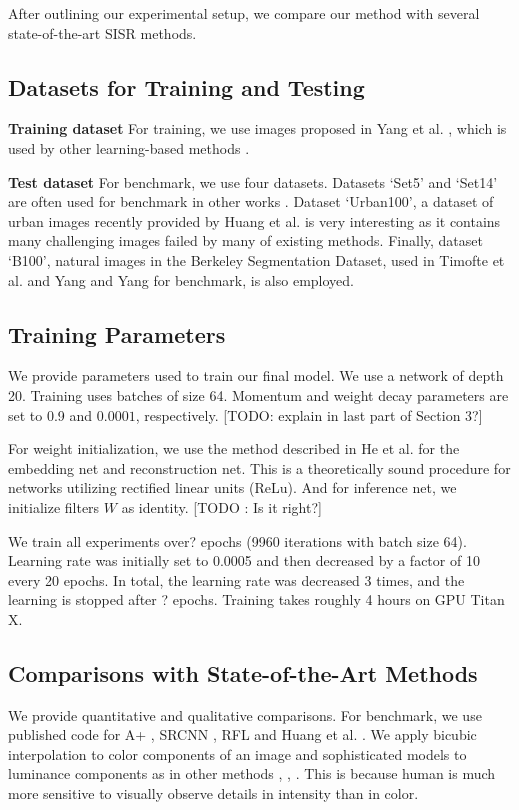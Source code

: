 \documentclass[10pt,twocolumn,letterpaper]{article}
\begin{document}
After outlining our experimental setup, we compare our method with several state-of-the-art SISR methods. 

\subsection{Datasets for Training and Testing}
\textbf{Training dataset} For training, we use images proposed in Yang et al. \cite{yang2010image}, which is used by other learning-based methods \cite{Timofte,Timofte2013,zeyde2012single}. 

\textbf{Test dataset} For benchmark, we use four datasets. Datasets `Set5' \cite{bevilacqua2012} and `Set14' \cite{zeyde2012single} are often used for benchmark in other works \cite{Timofte,Timofte2013,Dong2014}. Dataset `Urban100', a dataset of urban images recently provided by Huang et al. \cite{Huang-CVPR-2015} is very interesting as it contains many challenging images failed by many of existing methods. Finally, dataset `B100', natural images in the Berkeley Segmentation Dataset, used in Timofte et al. \cite{Timofte} and Yang and Yang \cite{Yang2013} for benchmark, is also employed. 
\subsection{Training Parameters}
We provide parameters used to train our final model. We use a network of depth 20. Training uses batches of size 64. Momentum and weight decay parameters are set to 0.9 and $0.0001$, respectively. [TODO: explain in last part of Section 3?]

For weight initialization, we use the method described in He et al. \cite{he2015delving} for the embedding net and reconstruction net. This is a theoretically sound procedure for networks utilizing rectified linear units (ReLu). And for inference net, we initialize filters $W$ as identity. [TODO : Is it right?]

We train all experiments over? epochs (9960 iterations with batch size 64). Learning rate was initially set to 0.0005 and then decreased by a factor of 10 every 20 epochs. In total, the learning rate was decreased 3 times, and the learning
is stopped after ? epochs. Training takes roughly 4 hours on GPU Titan X. 


\subsection{Comparisons with State-of-the-Art Methods}
We provide quantitative and qualitative comparisons. For benchmark, we use published code for A+ \cite{Timofte}, SRCNN \cite{dong2014image}, RFL \cite{schulter2015fast} and  Huang et al. \cite{Huang-CVPR-2015}. We apply bicubic interpolation to color components of an image and sophisticated models to luminance components as in  other methods \cite{chang2004super}, \cite{glasner2009super}, \cite{zeyde2012single}. This is because human is much more sensitive to visually observe details in intensity than in color. 
\end{document}
